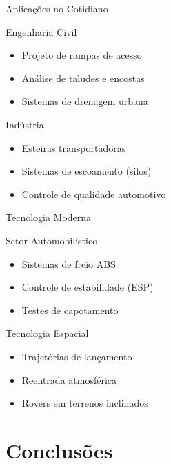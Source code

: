 \documentclass[12pt]{beamer}
\begin{document}
\begin{frame}{Aplicações no Cotidiano}
    \begin{block}{Engenharia Civil}
        \begin{itemize}
            \item Projeto de rampas de acesso
            \item Análise de taludes e encostas
            \item Sistemas de drenagem urbana
        \end{itemize}
    \end{block}

    \begin{block}{Indústria}
        \begin{itemize}
            \item Esteiras transportadoras
            \item Sistemas de escoamento (silos)
            \item Controle de qualidade automotivo
        \end{itemize}
    \end{block}
\end{frame}

\begin{frame}{Tecnologia Moderna}
    \begin{block}{Setor Automobilístico}
        \begin{itemize}
            \item Sistemas de freio ABS
            \item Controle de estabilidade (ESP)
            \item Testes de capotamento
        \end{itemize}
    \end{block}

    \begin{block}{Tecnologia Espacial}
        \begin{itemize}
            \item Trajetórias de lançamento
            \item Reentrada atmosférica
            \item Rovers em terrenos inclinados
        \end{itemize}
    \end{block}
\end{frame}

\section{Conclusões}
\end{document}
